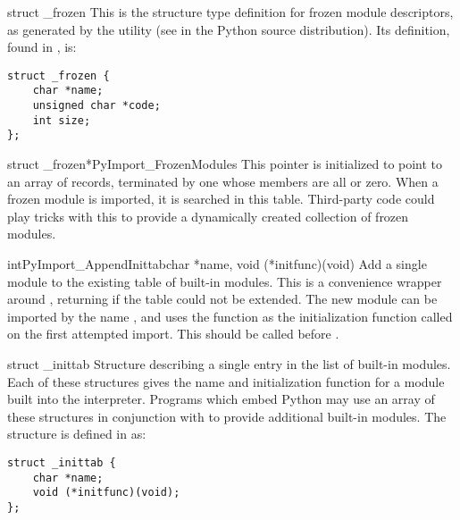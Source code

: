 \documentclass{manual}
\begin{document}
\begin{ctypedesc}[_frozen]{struct _frozen}
This is the structure type definition for frozen module descriptors,
as generated by the  utility
(see  in the Python source distribution).  Its
definition, found in , is:

\begin{verbatim}
struct _frozen {
    char *name;
    unsigned char *code;
    int size;
};
\end{verbatim}
\end{ctypedesc}

\begin{cvardesc}{struct _frozen*}{PyImport_FrozenModules}
This pointer is initialized to point to an array of  records, terminated by one whose members are all
\NULL{} or zero.  When a frozen module is imported, it is searched in
this table.  Third-party code could play tricks with this to provide a 
dynamically created collection of frozen modules.
\end{cvardesc}

\begin{cfuncdesc}{int}{PyImport_AppendInittab}{char *name,
                                               void (*initfunc)(void)}
Add a single module to the existing table of built-in modules.  This
is a convenience wrapper around ,
returning  if the table could not be extended.  The new
module can be imported by the name , and uses the function
 as the initialization function called on the first
attempted import.  This should be called before
.
\end{cfuncdesc}

\begin{ctypedesc}[_inittab]{struct _inittab}
Structure describing a single entry in the list of built-in modules.
Each of these structures gives the name and initialization function
for a module built into the interpreter.  Programs which embed Python
may use an array of these structures in conjunction with
 to provide additional built-in
modules.  The structure is defined in  as:

\begin{verbatim}
struct _inittab {
    char *name;
    void (*initfunc)(void);
};
\end{verbatim}
\end{ctypedesc}
\end{document}
